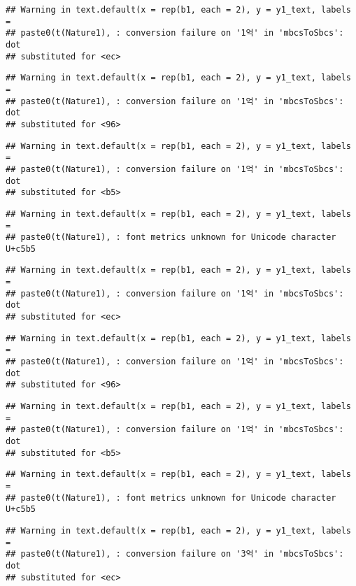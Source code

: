 \documentclass[
]{article}
\begin{document}
\begin{verbatim}
## Warning in text.default(x = rep(b1, each = 2), y = y1_text, labels =
## paste0(t(Nature1), : conversion failure on '1억' in 'mbcsToSbcs': dot
## substituted for <ec>
\end{verbatim}

\begin{verbatim}
## Warning in text.default(x = rep(b1, each = 2), y = y1_text, labels =
## paste0(t(Nature1), : conversion failure on '1억' in 'mbcsToSbcs': dot
## substituted for <96>
\end{verbatim}

\begin{verbatim}
## Warning in text.default(x = rep(b1, each = 2), y = y1_text, labels =
## paste0(t(Nature1), : conversion failure on '1억' in 'mbcsToSbcs': dot
## substituted for <b5>
\end{verbatim}

\begin{verbatim}
## Warning in text.default(x = rep(b1, each = 2), y = y1_text, labels =
## paste0(t(Nature1), : font metrics unknown for Unicode character U+c5b5
\end{verbatim}

\begin{verbatim}
## Warning in text.default(x = rep(b1, each = 2), y = y1_text, labels =
## paste0(t(Nature1), : conversion failure on '1억' in 'mbcsToSbcs': dot
## substituted for <ec>
\end{verbatim}

\begin{verbatim}
## Warning in text.default(x = rep(b1, each = 2), y = y1_text, labels =
## paste0(t(Nature1), : conversion failure on '1억' in 'mbcsToSbcs': dot
## substituted for <96>
\end{verbatim}

\begin{verbatim}
## Warning in text.default(x = rep(b1, each = 2), y = y1_text, labels =
## paste0(t(Nature1), : conversion failure on '1억' in 'mbcsToSbcs': dot
## substituted for <b5>
\end{verbatim}

\begin{verbatim}
## Warning in text.default(x = rep(b1, each = 2), y = y1_text, labels =
## paste0(t(Nature1), : font metrics unknown for Unicode character U+c5b5
\end{verbatim}

\begin{verbatim}
## Warning in text.default(x = rep(b1, each = 2), y = y1_text, labels =
## paste0(t(Nature1), : conversion failure on '3억' in 'mbcsToSbcs': dot
## substituted for <ec>
\end{verbatim}
\end{document}
